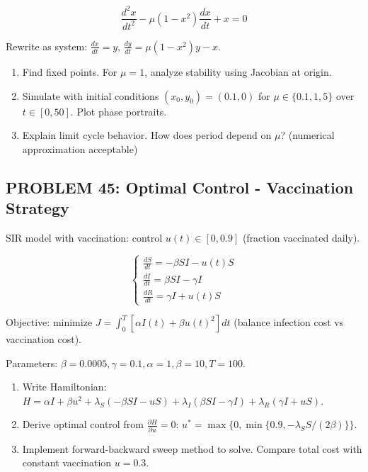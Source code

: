 \documentclass[12pt]{article}
\begin{document}
\[
\frac{d^2x}{dt^2} - \mu(1-x^2)\frac{dx}{dt} + x = 0
\]

Rewrite as system: \(\frac{dx}{dt} = y\), \(\frac{dy}{dt} = \mu(1-x^2)y - x\).

\begin{enumerate}
\item[(a)] Find fixed points. For \(\mu = 1\), analyze stability using Jacobian at origin.
\item[(b)] Simulate with initial conditions \((x_0, y_0) = (0.1, 0)\) for \(\mu \in \{0.1, 1, 5\}\) over \(t \in [0, 50]\). Plot phase portraits.
\item[(c)] Explain limit cycle behavior. How does period depend on \(\mu\)? (numerical approximation acceptable)
\end{enumerate}

\subsection*{PROBLEM 45: Optimal Control - Vaccination Strategy}

SIR model with vaccination: control \(u(t) \in [0, 0.9]\) (fraction vaccinated daily).

\[
\begin{cases}
\frac{dS}{dt} = -\beta SI - u(t)S \\
\frac{dI}{dt} = \beta SI - \gamma I \\
\frac{dR}{dt} = \gamma I + u(t)S
\end{cases}
\]

Objective: minimize \(J = \int_0^T [\alpha I(t) + \beta u(t)^2] dt\) (balance infection cost vs vaccination cost).

Parameters: \(\beta = 0.0005, \gamma = 0.1, \alpha = 1, \beta = 10, T = 100\).

\begin{enumerate}
\item[(a)] Write Hamiltonian: \(H = \alpha I + \beta u^2 + \lambda_S(-\beta SI - uS) + \lambda_I(\beta SI - \gamma I) + \lambda_R(\gamma I + uS)\).
\item[(b)] Derive optimal control from \(\frac{\partial H}{\partial u} = 0\): \(u^* = \max\{0, \min\{0.9, -\lambda_S S/(2\beta)\}\}\).
\item[(c)] Implement forward-backward sweep method to solve. Compare total cost with constant vaccination \(u = 0.3\).
\end{enumerate}
\end{document}
